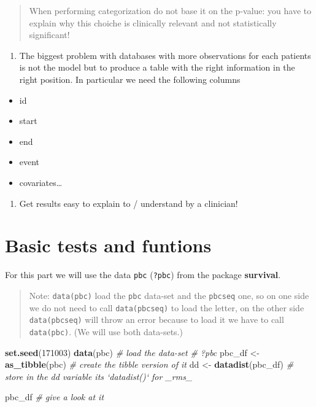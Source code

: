 \documentclass[]{book}
\newenvironment{Shaded}{\begin{snugshade}}{\end{snugshade}}
\newcommand{\KeywordTok}[1]{\textcolor[rgb]{0.13,0.29,0.53}{\textbf{{#1}}}}
\newcommand{\DecValTok}[1]{\textcolor[rgb]{0.00,0.00,0.81}{{#1}}}
\newcommand{\StringTok}[1]{\textcolor[rgb]{0.31,0.60,0.02}{{#1}}}
\newcommand{\CommentTok}[1]{\textcolor[rgb]{0.56,0.35,0.01}{\textit{{#1}}}}
\newcommand{\NormalTok}[1]{{#1}}
\providecommand{\tightlist}{%
  \setlength{\itemsep}{0pt}\setlength{\parskip}{0pt}}
\theoremstyle{definition}
\theoremstyle{definition}
\theoremstyle{definition}
\theoremstyle{remark}
\begin{document}
\begin{quote}
When performing categorization do not base it on the p-value: you have
to explain why this choiche is clinically relevant and not statistically
significant!
\end{quote}

\begin{enumerate}
\def\labelenumi{\arabic{enumi}.}
\setcounter{enumi}{3}
\tightlist
\item
  The biggest problem with databases with more observations for each
  patients is not the model but to produce a table with the right
  information in the right position. In particular we need the following
  columns
\end{enumerate}

\begin{itemize}
\tightlist
\item
  id
\item
  start
\item
  end
\item
  event
\item
  covariates\ldots{}
\end{itemize}

\begin{enumerate}
\def\labelenumi{\arabic{enumi}.}
\setcounter{enumi}{4}
\tightlist
\item
  Get results easy to explain to / understand by a clinician!
\end{enumerate}

\section{Basic tests and funtions}\label{test2}

For this part we will use the data \texttt{pbc} (\texttt{?pbc}) from the
package \textbf{survival}.

\begin{quote}
Note: \texttt{data(pbc)} load the \texttt{pbc} data-set and the
\texttt{pbcseq} one, so on one side we do not need to call
\texttt{data(pbcseq)} to load the letter, on the other side
\texttt{data(pbcseq)} will throw an error because to load it we have to
call \texttt{data(pbc)}. (We will use both data-sets.)
\end{quote}

\begin{Shaded}
\begin{Highlighting}[]
\KeywordTok{set.seed}\NormalTok{(}\DecValTok{171003}\NormalTok{)}
\KeywordTok{data}\NormalTok{(pbc)                                                    }\CommentTok{# load the data-set}
\CommentTok{# ?pbc}
\NormalTok{pbc_df <-}\StringTok{ }\KeywordTok{as_tibble}\NormalTok{(pbc)                       }\CommentTok{# create the tibble version of it}
\NormalTok{dd <-}\StringTok{ }\KeywordTok{datadist}\NormalTok{(pbc_df)     }\CommentTok{# store in the dd variable its `datadist()` for _rms_}

\NormalTok{pbc_df                                                       }\CommentTok{# give a look at it}
\end{Highlighting}
\end{Shaded}
\end{document}

